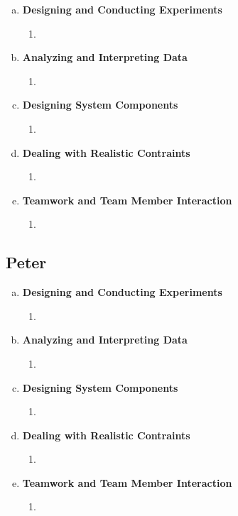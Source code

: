 \documentclass[11pt]{article}   %
\begin{document}
\begin{enumerate} [a)]
\item  {\bf Designing and Conducting Experiments}
\begin{enumerate} [$\cdot$]
\item 
\end{enumerate}
\item  {\bf Analyzing and Interpreting Data}
\begin{enumerate} [$\cdot$]
\item  
\end{enumerate}
\item {\bf Designing System Components}
\begin{enumerate} [$\cdot$]
\item 
\end{enumerate}
\item {\bf Dealing with Realistic Contraints}
\begin{enumerate} [$\cdot$]
\item 
\end{enumerate}
\item  {\bf Teamwork and Team Member Interaction}
\begin{enumerate} [$\cdot$]
\item 
\end{enumerate}
\end{enumerate}

\subsection*{Peter}

\begin{enumerate} [a)]
\item  {\bf Designing and Conducting Experiments}
\begin{enumerate} [$\cdot$]
\item 
\end{enumerate}
\item  {\bf Analyzing and Interpreting Data}
\begin{enumerate} [$\cdot$]
\item  
\end{enumerate}
\item {\bf Designing System Components}
\begin{enumerate} [$\cdot$]
\item 
\end{enumerate}
\item {\bf Dealing with Realistic Contraints}
\begin{enumerate} [$\cdot$]
\item 
\end{enumerate}
\item  {\bf Teamwork and Team Member Interaction}
\begin{enumerate} [$\cdot$]
\item 
\end{enumerate}
\end{enumerate}
\end{document}
